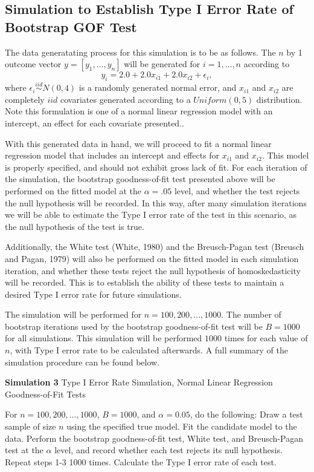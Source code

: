 		\subsection{Simulation to Establish Type I Error Rate of Bootstrap GOF Test}

		The data generatating process for this simulation is to be as follows. The $n$ by 1 outcome vector $y = [y_1,...,y_n]$ will be generated for $i = 1,...,n$ according
		to
		\begin{equation}
			y_i = 2.0 + 2.0 x_{i1} + 2.0 x_{i2} + \epsilon_i , 
		\end{equation}
		where $\epsilon_i \stackrel{iid}{\sim} N(0,4)$ is a randomly generated normal error, and $x_{i1}$ and $x_{i2}$ are completely $iid$ covariates generated according to
		a $Uniform(0,5)$ distribution. Note this formulation is one of a normal linear regression model with an intercept, an effect for each covariate presented..

		With this generated data in hand, we will proceed to fit a normal linear regression model that includes an intercept and effects for $x_{i1}$ and $x_{i2}$. This model
		is properly specified, and should not exhibit gross lack of fit. For each iteration of the simulation, the bootstrap goodness-of-fit test presented above will be
		performed on the fitted model at the $\alpha = .05$ level, and whether the test rejects the null hypothesis will be recorded. In this way, after many simulation iterations
		we will be able to estimate the Type I error rate of the test in this scenario, as the null hypothesis of the test is true.

		Additionally, the White test (White, 1980) and the Breusch-Pagan test (Breusch and Pagan, 1979) will also be performed on the fitted model in each simulation iteration, and
		whether these tests reject the null hypothesis of homoskedasticity will be recorded. This is to establish the ability of these tests to maintain a desired Type
		I error rate for future simulations.

		The simulation will be performed for $n = 100,200,...,1000$. The number of bootstrap iterations used by the bootstrap goodness-of-fit test will be $B = 1000$ for all simulations.
		This simulation will be performed $1000$ times for each value of $n$, with Type I error rate to be calculated afterwards. A full summary of the simulation procedure can be found below.
		\begin{algorithm}[H]
			\caption*{\textbf{Simulation 3} Type I Error Rate Simulation, Normal Linear Regression Goodness-of-Fit Tests}
			\begin{algorithmic}[1]
			  \Statex For $n = 100,200,...,1000$, $B = 1000$, and $\alpha = 0.05$, do the following:
			  \State Draw a test sample of size $n$ using the specified true model.
			  \State Fit the candidate model to the data.
			  \State Perform the bootstrap goodness-of-fit test, White test, and Breusch-Pagan test at the $\alpha$ level,
			  and record whether each test rejects its null hypothesis.
			  \State Repeat steps 1-3 1000 times.
			  \State Calculate the Type I error rate of each test.
			\end{algorithmic}
		\end{algorithm}

